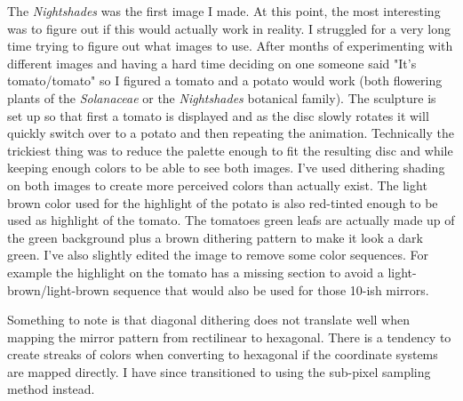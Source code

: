 \documentclass{article}
\begin{document}
The \emph{Nightshades} was the first image I made. At this point, the most
interesting was to figure out if this would actually work in reality. I
struggled for a very long time trying to figure out what images to use.
After months of experimenting with different images and having a hard
time deciding on one someone said "It's tomato/tomato" so I figured a
tomato and a potato would work (both flowering plants of the
\emph{Solanaceae} or the \emph{Nightshades} botanical family). The
sculpture is set up so that first a tomato is displayed and as the
disc slowly rotates it will quickly switch over to a potato and then
repeating the animation. Technically the trickiest thing was to reduce
the palette enough to fit the resulting disc and while keeping enough
colors to be able to see both images. I've used dithering shading on
both images to create more perceived colors than actually exist. The
light brown color used for the highlight of the potato is also
red-tinted enough to be used as highlight of the tomato. The tomatoes
green leafs are actually made up of the green background plus a brown
dithering pattern to make it look a dark green. I've also slightly
edited the image to remove some color sequences. For example the
highlight on the tomato has a missing section to avoid a
light-brown/light-brown sequence that would also be used for those
10-ish mirrors.

Something to note is that diagonal dithering does not translate well
when mapping the mirror pattern from rectilinear to hexagonal. There is
a tendency to create streaks of colors when converting to hexagonal if
the coordinate systems are mapped directly. I have since transitioned
to using the sub-pixel sampling method instead.
\end{document}
